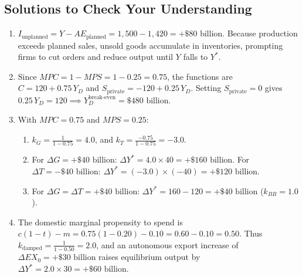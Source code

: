 \documentclass[11pt,letterpaper]{article}
\begin{document}
\subsection*{Solutions to Check Your Understanding}
\begin{enumerate}
    \item $I_{\text{unplanned}} = Y - AE_{\text{planned}} = 1{,}500 - 1{,}420 = +\$80\text{ billion}$. Because production exceeds planned sales, unsold goods accumulate in inventories, prompting firms to cut orders and reduce output until $Y$ falls to $Y^*$.
    \item Since $MPC = 1 - MPS = 1 - 0.25 = 0.75$, the functions are $C = 120 + 0.75\,Y_D$ and $S_{\text{private}} = -120 + 0.25\,Y_D$. Setting $S_{\text{private}} = 0$ gives $0.25\,Y_D = 120 \implies Y_D^{\text{break-even}} = \$480\text{ billion}$.
    \item With $MPC = 0.75$ and $MPS = 0.25$:
    \begin{enumerate}
        \item $k_G = \frac{1}{1 - 0.75} = 4.0$, and $k_T = \frac{-0.75}{1 - 0.75} = -3.0$.
        \item For $\Delta G = +\$40\text{ billion}$: $\Delta Y^* = 4.0 \times 40 = +\$160\text{ billion}$. For $\Delta T = -\$40\text{ billion}$: $\Delta Y^* = (-3.0) \times (-40) = +\$120\text{ billion}$.
        \item For $\Delta G = \Delta T = +\$40\text{ billion}$: $\Delta Y^* = 160 - 120 = +\$40\text{ billion}$ ($k_{BB} = 1.0$).
    \end{enumerate}
    \item The domestic marginal propensity to spend is $c(1 - t) - m = 0.75(1 - 0.20) - 0.10 = 0.60 - 0.10 = 0.50$. Thus $k_{\text{damped}} = \frac{1}{1 - 0.50} = 2.0$, and an autonomous export increase of $\Delta EX_0 = +\$30\text{ billion}$ raises equilibrium output by $\Delta Y^* = 2.0 \times 30 = +\$60\text{ billion}$.
\end{enumerate}
\end{document}
